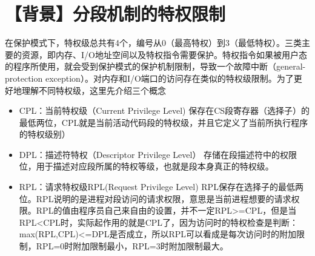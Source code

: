 \section{【背景】分段机制的特权限制}\label{ux80ccux666fux5206ux6bb5ux673aux5236ux7684ux7279ux6743ux9650ux5236}

在保护模式下，特权级总共有4个，编号从0（最高特权）到3（最低特权）。三类主要的资源，即内存、I/O地址空间以及特权指令需要保护。特权指令如果被用户态的程序所使用，就会受到保护模式的保护机制限制，导致一个故障中断（general-protection
exception）。对内存和I/O端口的访问存在类似的特权级限制。为了更好地理解不同特权级，这里先介绍三个概念

\begin{itemize}
\item
  CPL：当前特权级（Current Privilege Level)
  保存在CS段寄存器（选择子）的最低两位，CPL就是当前活动代码段的特权级，并且它定义了当前所执行程序的特权级别）
\item
  DPL：描述符特权（Descriptor Privilege Level）
  存储在段描述符中的权限位，用于描述对应段所属的特权等级，也就是段本身真正的特权级。
\item
  RPL：请求特权级RPL(Request Privilege Level)
  RPL保存在选择子的最低两位。RPL说明的是进程对段访问的请求权限，意思是当前进程想要的请求权限。RPL的值由程序员自己来自由的设置，并不一定RPL\textgreater{}=CPL，但是当RPL\textless{}CPL时，实际起作用的就是CPL了，因为访问时的特权检查是判断：max(RPL,CPL)\textless{}=DPL是否成立，所以RPL可以看成是每次访问时的附加限制，RPL=0时附加限制最小，RPL=3时附加限制最大。
\end{itemize}
